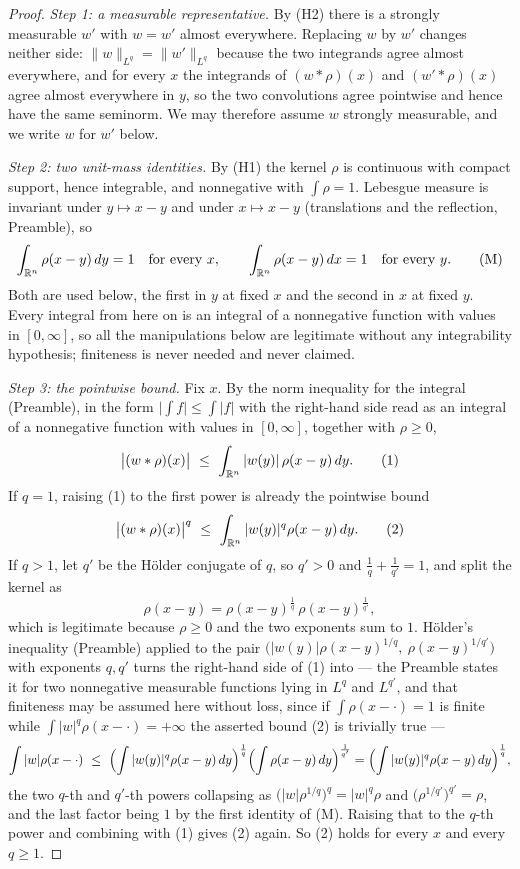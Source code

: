 \begin{proof}
\emph{Step 1: a measurable representative.}  By (H2) there is a strongly
measurable $w'$ with $w=w'$ almost everywhere.  Replacing $w$ by $w'$ changes
neither side: $\|w\|_{L^q}=\|w'\|_{L^q}$ because the two integrands agree
almost everywhere, and for every $x$ the integrands of $(w*\rho)(x)$ and
$(w'*\rho)(x)$ agree almost everywhere in $y$, so the two convolutions agree
pointwise and hence have the same seminorm.  We may therefore assume $w$
strongly measurable, and we write $w$ for $w'$ below.

\emph{Step 2: two unit-mass identities.}  By (H1) the kernel $\rho$ is
continuous with compact support, hence integrable, and nonnegative with
$\int\rho=1$.  Lebesgue measure is invariant under $y\mapsto x-y$ and under
$x\mapsto x-y$ (translations and the reflection, Preamble), so
\[
\int_{\mathbb{R}^n}\rho(x-y)\,dy=1\quad\text{for every }x,
\qquad
\int_{\mathbb{R}^n}\rho(x-y)\,dx=1\quad\text{for every }y .
\tag{M}
\]
Both are used below, the first in $y$ at fixed $x$ and the second in $x$ at
fixed $y$.  Every integral from here on is an integral of a nonnegative
function with values in $[0,\infty]$, so all the manipulations below are
legitimate without any integrability hypothesis; finiteness is never needed and
never claimed.

\emph{Step 3: the pointwise bound.}  Fix $x$.  By the norm inequality for the
integral (Preamble), in the form $\bigl|\int f\bigr|\le\int|f|$ with the
right-hand side read as an integral of a nonnegative function with values in
$[0,\infty]$, together with $\rho\ge0$,
\[
\bigl|(w*\rho)(x)\bigr|\ \le\ \int_{\R^n}|w(y)|\,\rho(x-y)\,dy .
\tag{1}
\]
If $q=1$, raising (1) to the first power is already the pointwise bound
\[
\bigl|(w*\rho)(x)\bigr|^{q}\ \le\ \int_{\R^n}|w(y)|^{q}\rho(x-y)\,dy .
\tag{2}
\]
If $q>1$, let $q'$ be the Hölder conjugate of $q$, so $q'>0$ and
$\tfrac1q+\tfrac1{q'}=1$, and split the kernel as
\[
\rho(x-y)=\rho(x-y)^{\frac1q}\,\rho(x-y)^{\frac1{q'}} ,
\]
which is legitimate because $\rho\ge0$ and the two exponents sum to $1$.
Hölder's inequality (Preamble) applied to the pair
$\bigl(|w(y)|\rho(x-y)^{1/q},\ \rho(x-y)^{1/q'}\bigr)$ with exponents $q,q'$
turns the right-hand side of (1) into --- the Preamble states it for two
nonnegative measurable functions lying in $L^{q}$ and $L^{q'}$, and that
finiteness may be assumed here without loss, since if $\int\rho(x-\cdot)=1$ is
finite while $\int|w|^{q}\rho(x-\cdot)=+\infty$ the asserted bound (2) is
trivially true ---
\[
\int|w|\rho(x-\cdot)
\ \le\ \Bigl(\int|w(y)|^{q}\rho(x-y)\,dy\Bigr)^{\frac1q}
   \Bigl(\int\rho(x-y)\,dy\Bigr)^{\frac1{q'}}
= \Bigl(\int|w(y)|^{q}\rho(x-y)\,dy\Bigr)^{\frac1q},
\]
the two $q$-th and $q'$-th powers collapsing as
$\bigl(|w|\rho^{1/q}\bigr)^{q}=|w|^{q}\rho$ and
$\bigl(\rho^{1/q'}\bigr)^{q'}=\rho$, and the last factor being $1$ by the first
identity of (M).  Raising that to the $q$-th power and combining with (1) gives
(2) again.  So (2) holds for every $x$ and every $q\ge1$.


\end{proof}
